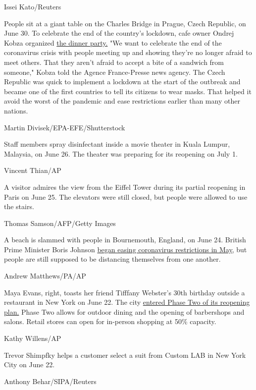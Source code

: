 Issei Kato/Reuters

People sit at a giant table on the Charles Bridge in Prague, Czech
Republic, on June 30. To celebrate the end of the country's lockdown,
cafe owner Ondrej Kobza organized
\href{https://www.cnn.com/travel/article/czech-public-dinner-lockdown-scli-intl/index.html}{the
dinner party.} "We want to celebrate the end of the coronavirus crisis
with people meeting up and showing they're no longer afraid to meet
others. That they aren't afraid to accept a bite of a sandwich from
someone," Kobza told the Agence France-Presse news agency. The Czech
Republic was quick to implement a lockdown at the start of the outbreak
and became one of the first countries to tell its citizens to wear
masks. That helped it avoid the worst of the pandemic and ease
restrictions earlier than many other nations.

Martin Divisek/EPA-EFE/Shutterstock

Staff members spray disinfectant inside a movie theater in Kuala Lumpur,
Malaysia, on June 26. The theater was preparing for its reopening on
July 1.

Vincent Thian/AP

A visitor admires the view from the Eiffel Tower during its partial
reopening in Paris on June 25. The elevators were still closed, but
people were allowed to use the stairs.

Thomas Samson/AFP/Getty Images

A beach is slammed with people in Bournemouth, England, on June 24.
British Prime Minister Boris Johnson
\href{https://www.cnn.com/2020/05/10/uk/uk-coronavirus-lockdown-boris-johnson-gbr-intl/index.html}{began
easing coronavirus restrictions in May,} but people are still supposed
to be distancing themselves from one another.

Andrew Matthews/PA/AP

Maya Evans, right, toasts her friend Tifffany Webster's 30th birthday
outside a restaurant in New York on June 22. The city
\href{https://www.cnn.com/2020/06/22/health/us-coronavirus-monday/index.html}{entered
Phase Two of its reopening plan.} Phase Two allows for outdoor dining
and the opening of barbershops and salons. Retail stores can open for
in-person shopping at 50\% capacity.

Kathy Willens/AP

Trevor Shimpfky helps a customer select a suit from Custom LAB in New
York City on June 22.

Anthony Behar/SIPA/Reuters

